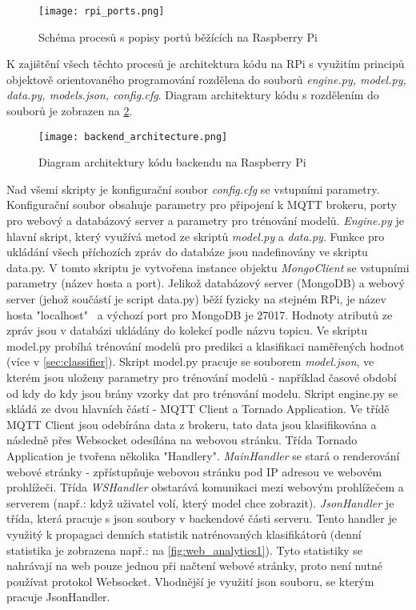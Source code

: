 \begin{figure}[H]
  \centering
  \texttt{[image: rpi\_ports.png]}
  \caption{Schéma procesů s popisy portů běžících na Raspberry Pi}
  \label{fig:rpi_ports}
\end{figure}

K zajištění všech těchto procesů je architektura kódu na RPi s využitím principů objektově orientovaného programování rozdělena do souborů \textit{engine.py, model.py, data.py, models.json, config.cfg}. Diagram architektury kódu s rozdělením do souborů je zobrazen na \cref{fig:backend_architecture}.

\begin{figure}[H]
  \centering
  \texttt{[image: backend\_architecture.png]}
  \caption{Diagram architektury kódu backendu na Raspberry Pi}
  \label{fig:backend_architecture}
\end{figure}

Nad všemi skripty je konfigurační soubor \textit{config.cfg} se vstupními parametry. Konfigurační soubor obsahuje parametry pro připojení k MQTT brokeru, porty pro webový a databázový server a parametry pro trénování modelů. \textit{Engine.py} je hlavní skript, který využívá metod ze skriptů \textit{model.py} a \textit{data.py}. Funkce pro ukládání všech příchozích zpráv do databáze jsou nadefinovány ve skriptu data.py. V tomto skriptu je vytvořena instance objektu \textit{MongoClient} se vstupními parametry (název hosta a port). Jelikož databázový server (MongoDB) a webový server (jehož součástí je script data.py) běží fyzicky na stejném RPi, je název hosta "localhost" \ a výchozí port pro MongoDB je 27017. Hodnoty atributů ze zpráv jsou v databázi ukládány do kolekcí podle názvu topicu. Ve skriptu model.py probíhá trénování modelů pro predikci a klasifikaci naměřených hodnot (více v \cref{sec:classifier}). Skript model.py pracuje se souborem \textit{model.json}, ve kterém jsou uloženy parametry pro trénování modelů - například časové období od kdy do kdy jsou brány vzorky dat pro trénování modelu. Skript engine.py se skládá ze dvou hlavních částí - MQTT Client a Tornado Application. Ve třídě MQTT Client jsou odebírána data z brokeru, tato data jsou klasifikována a následně přes Websocket odesílána na webovou stránku. Třída Tornado Application je tvořena několika "Handlery". \textit{MainHandler} se stará o renderování webové stránky - zpřístupňuje webovou stránku pod IP adresou ve webovém prohlížeči. Třída \textit{WSHandler} obstarává komunikaci mezi webovým prohlížečem a serverem (např.: když uživatel volí, který model chce zobrazit). \textit{JsonHandler} je třída, která pracuje s json soubory v backendové části serveru. Tento handler je využitý k propagaci denních statistik natrénovaných klasifikátorů (denní statistika je zobrazena např.: na \cref{fig:web_analytics1}). Tyto statistiky se nahrávají na web pouze jednou při načtení webové stránky, proto není nutné používat protokol Websocket. Vhodnější je využití json souboru, se kterým pracuje JsonHandler.

